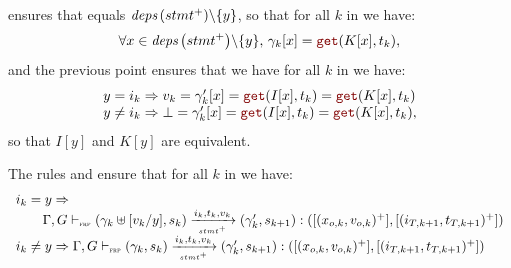 \begin{skippableproof}
\begin{itemize}
\begin{itemize}
                         ensures that
                         equals ${\textit{deps}\left(stmt^+\right)} \backslash \{y\}$, so
                        that for all $k$ in \N we have:
                        \begin{equation*}
                            \forall x \in \depSet{stmt^+} \backslash \{y\}, \, \gamma_k[x] = \getAt{K[x]}{t_k},
                        \end{equation*}
                        and the previous point ensures that we have for all $k$ in \N we have:
                        \begin{equation*}
                            \begin{array}{l}
                                y = i_k \Rightarrow v_k = \gamma'_k[x] = \getAt{I[x]}{t_k} = \getAt{K[x]}{t_k} \\
                                y \neq i_k \Rightarrow \bot = \gamma'_k[x] = \getAt{I[x]}{t_k} = \getAt{K[x]}{t_k},
                            \end{array}
                        \end{equation*}
                        so that $I[y]$ and $K[y]$ are equivalent.

                        The rules  and
                         ensure that for
                        all $k$ in \N we have:
                        \begin{equation*}
                            \begin{array}{l}
                                i_k = y \Rightarrow                                                                     \\
                                \qquad \Gamma, G \vdash_{\textnormal{\tiny\textsc{frp}}} (\gamma_k \uplus [v_k/y], s_k) \xrightarrow[\mbox{\tiny\ensuremath{stmt^+}}]{i_k, t_k, v_k} (\gamma'_k, s_{k+1}): ([(x_{o, k}, v_{o, k})^+], [(i_{T, k+1}, t_{T, k+1})^+]) \\
                                i_k \neq y \Rightarrow \Gamma, G \vdash_{\textnormal{\tiny\textsc{frp}}} (\gamma_k, s_k) \xrightarrow[\mbox{\tiny\ensuremath{stmt^+}}]{i_k, t_k, v_k} (\gamma'_k, s_{k+1}): ([(x_{o, k}, v_{o, k})^+], [(i_{T, k+1}, t_{T, k+1})^+])
                            \end{array}
                        \end{equation*}


\end{itemize}
\end{itemize}
\end{skippableproof}
